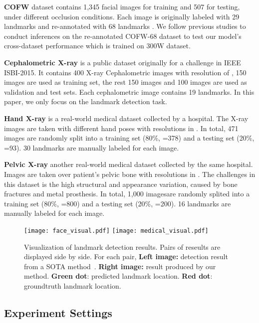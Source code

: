 \documentclass[runningheads]{llncs}
\begin{document}
\noindent\textbf{COFW} \cite{burgos2013robust} dataset contains 1,345 facial images for training and 507 for testing, under different occlusion conditions. Each image is originally labeled with 29 landmarks and re-annotated with 68 landmarks \cite{ghiasi2015occlusion}. We follow previous studies \cite{wu2018look,qian2019aggregation} to conduct inferences on the re-annotated COFW-68 dataset to test our model's cross-dataset performance which is trained on 300W dataset.

\noindent\textbf{Cephalometric X-ray} \cite{wang2016benchmark} is a public dataset originally for a challenge in IEEE ISBI-2015. It contains 400 X-ray Cephalometric images with resolution of , 150 images are used as training set, the rest 150 images and 100 images are used as validation and test sets. Each cephalometric image contains 19 landmarks. In this paper, we only focus on the landmark detection task.

\noindent\textbf{Hand X-ray} \cite{lu2020learning} is a real-world medical dataset collected by a hospital. The X-ray images are taken with different hand poses with resolutions in . In total, 471 images are randomly split into a training set (80\%, =378) and a testing set (20\%, =93). 30 landmarks are manually labeled for each image.

\noindent\textbf{Pelvic X-ray} \cite{wang2019weakly,chen2020anatomy} another real-world medical dataset collected by the same hospital. Images are taken over patient's pelvic bone with resolutions in . The challenges in this dataset is the high structural and appearance variation, caused by bone fractures and metal prosthesis. In total, 1,000 imagesare randomly splited into a training set (80\%, =800) and a testing set (20\%, =200). 16 landmarks are manually labeled for each image. 

\begin{figure*}[t]
	\centering
	\texttt{[image: face\_visual.pdf]}
	\texttt{[image: medical\_visual.pdf]}
	\caption{Visualization of landmark detection results. Pairs of reseults are displayed side by side. 
	For each pair, \textbf{Left image:} detection result from a SOTA method~\cite{sun2019deep}. \textbf{Right image:} result produced by our method. \textbf{Green dot}: predicted landmark location. \textbf{Red dot}: groundtruth landmark location.
	}
	\label{fig:face_visual}
\end{figure*}


\subsection{Experiment Settings}
\end{document}
